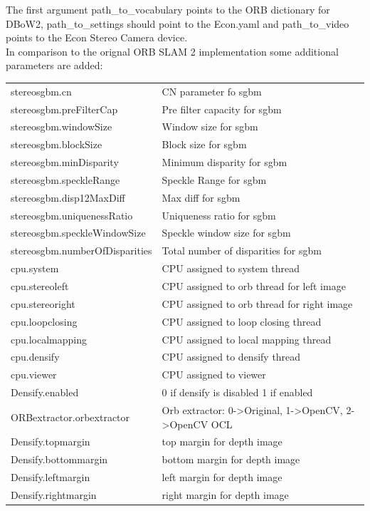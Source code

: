\documentclass[11pt,a4paper,titlepage,oneside]{report}
\begin{document}
The first argument path\_to\_vocabulary points to the ORB dictionary for DBoW2, path\_to\_settings should point to the Econ.yaml and path\_to\_video points to the Econ Stereo Camera device.\\
In comparison to the orignal ORB SLAM 2 implementation some additional parameters are added:\\
\begin{tabular}{l l}
stereosgbm.cn & CN parameter fo sgbm \\
stereosgbm.preFilterCap & Pre filter capacity for sgbm \\
stereosgbm.windowSize & Window size for sgbm \\
stereosgbm.blockSize & Block size for sgbm \\
stereosgbm.minDisparity & Minimum disparity for sgbm \\
stereosgbm.speckleRange &  Speckle Range for sgbm \\
stereosgbm.disp12MaxDiff & Max diff for sgbm \\
stereosgbm.uniquenessRatio & Uniqueness ratio for sgbm \\
stereosgbm.speckleWindowSize & Speckle window size for sgbm \\
stereosgbm.numberOfDisparities & Total number of disparities for sgbm \\
cpu.system & CPU assigned to system thread \\
cpu.stereoleft & CPU assigned to orb thread for left image \\
cpu.stereoright & CPU assigned to orb thread for right image \\
cpu.loopclosing & CPU assigned to loop closing thread \\
cpu.localmapping & CPU assigned to local mapping thread \\
cpu.densify & CPU assigned to densify thread \\
cpu.viewer & CPU assigned to viewer \\
Densify.enabled & 0 if densify is disabled 1 if enabled \\
ORBextractor.orbextractor & Orb extractor: 0->Original, 1->OpenCV, 2->OpenCV OCL \\
Densify.topmargin & top margin for depth image \\
Densify.bottommargin & bottom margin for depth image \\
Densify.leftmargin & left margin for depth image \\
Densify.rightmargin & right margin for depth image \\
\end{tabular}\\
\end{document}

